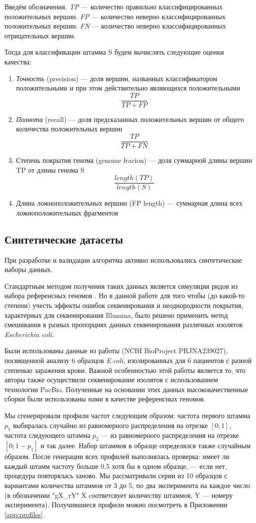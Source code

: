 \documentclass{spbau-diploma}
\begin{document}
Введём обозначения. \textit{TP} --- количество правильно классифицированных положительных вершин. \textit{FP} --- количество неверно классифицированных положительных вершин. \textit{FN} --- количество неверно классифицированных отрицательных вершин.

Тогда для классификации штамма S будем вычислять следующие оценки качества:
\begin{enumerate}
    \item \textit{Точность} (precision) --- доля вершин, названных классификатором положительными и при этом действительно являющихся положительными $$\frac{TP}{TP+FP}$$
    \item \textit{Полнота} (recall) --- доля предсказанных положительных вершин от общего количества положительных вершин $$\frac{TP}{TP+FN}$$
    \item Степень покрытия генома (genome fracion) --- доля суммарной длины вершин TP от длины генома S $$\frac{length(TP)}{length(S)}$$
    \item Длина ложноположительных вершин (FP length) --- суммарная длина всех ложноположительных фрагментов
\end{enumerate}

\subsection{Синтетические датасеты}
При разработке и валидации алгоритма активно использовались синтетические наборы данных. 

Стандартным методом получения таких данных является симуляция ридов из набора референсных геномов \cite{DESMAN, CONCOCT}.
Но в данной работе для того чтобы (до какой-то степени) учесть эффекты ошибок секвенирования и неоднородности покрытия, характерных для секвенирования Illumina, было решено применить метод смешивания в разных пропорциях данных секвенирования различных изолятов \textit{Escherichia coli}. 

Были использованы данные из работы \cite{isolates} (NCBI BioProject PRJNA239027), посвященной анализу 6 образцов \textit{E.coli}, изолированных для 6 пациентов с разной степенью заражения крови. 
Важной особенностью этой работы является то, что авторы также осуществили секвенирование изолятов с использованием технологии PacBio. 
Полученные на основании этих данных высококачественные сборки были использованы нами в качестве референсных геномов.

Мы сгенерировали профили частот следующим образом: частота первого штамма $p_1$ выбиралась случайно из равномерного распределения на отрезке $[0;1]$, частота следующего штамма $p_2$ --- из равномерного распределения на отрезке $[0;1-p_1]$ и так далее. Набор штаммов в образце определялся также случайным образом. После генерации всех профилей выполнялась проверка: имеет ли каждый штамм частоту больше 0.5 хотя бы в одном образце, --- если нет, процедура повторялась заново. Мы рассматривали серии из 10 образцов с вариантами количества штаммов от 3 до 5, по два эксперимента на каждое число (в обозначении "gX\_rY" X cоответсвует количеству штаммов, Y --- номеру эксперимента). Получившиеся профили можно посмотреть в Приложении \ref{app:profiles}.
\end{document}
